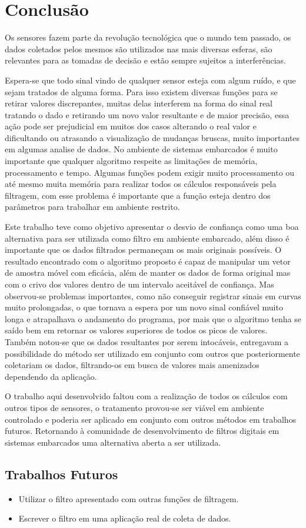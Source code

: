 
\chapter{Conclusão}\label{cap:conclusao}

Os sensores fazem parte da revolução tecnológica que o mundo tem passado, os dados coletados pelos mesmos são utilizados nas mais diversas esferas, são relevantes para as tomadas de decisão e estão sempre sujeitos a interferências.
 
Espera-se que todo sinal vindo de qualquer sensor esteja com algum ruído, e que sejam tratados de alguma forma. Para isso existem diversas funções para se retirar valores discrepantes, muitas delas interferem na forma do sinal real tratando o dado e retirando um novo valor resultante e de maior precisão, essa ação pode ser prejudicial em muitos dos casos alterando o real valor e dificultando ou atrasando a visualização de mudanças bruscas, muito importantes em algumas analise de dados. 
No ambiente de sistemas embarcados é muito importante que qualquer algoritmo respeite as limitações de memória, processamento e tempo. Algumas funções podem exigir muito processamento ou até mesmo muita memória para realizar todos os cálculos responsáveis pela filtragem, com esse problema é importante que a função esteja dentro dos parâmetros para trabalhar em ambiente restrito.

Este trabalho teve como objetivo apresentar o desvio de confiança como uma boa alternativa para ser utilizada como filtro em ambiente embarcado, além disso é importante que os dados filtrados permaneçam os mais originais possíveis. 
O resultado encontrado com o algoritmo proposto é capaz de manipular um vetor de amostra móvel com eficácia, além de manter os dados de forma original mas com o crivo dos valores dentro de um intervalo aceitável de confiança. 
Mas observou-se problemas importantes, como não conseguir registrar sinais em curvas muito prolongadas, o que tornava a espera por um novo sinal confiável muito longa e atrapalhava o andamento do programa, por mais que o algoritmo tenha se saído bem em retornar os valores superiores de todos os picos de valores. Também notou-se que os dados resultantes por serem intocáveis, entregavam a possibilidade do método ser utilizado em conjunto com outros que posteriormente coletariam os dados, filtrando-os em busca de valores mais amenizados dependendo da aplicação.
 
O trabalho aqui desenvolvido faltou com a realização de todos os cálculos com outros tipos de sensores, o tratamento provou-se ser viável em ambiente controlado e poderia ser aplicado em conjunto com outros métodos em trabalhos futuros. Retornando à comunidade de desenvolvimento de filtros digitais em sistemas embarcados uma alternativa aberta a ser utilizada.


\section{Trabalhos Futuros}

\begin{itemize}
    \item Utilizar o filtro apresentado com outras funções de filtragem.
    \item Escrever o filtro em uma aplicação real de coleta de dados.
  \end{itemize}
